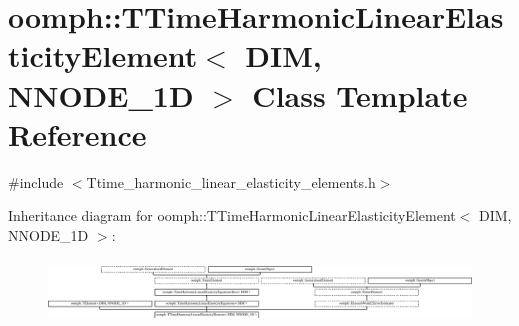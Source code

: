 \hypertarget{classoomph_1_1TTimeHarmonicLinearElasticityElement}{}\section{oomph\+:\+:T\+Time\+Harmonic\+Linear\+Elasticity\+Element$<$ D\+IM, N\+N\+O\+D\+E\+\_\+1D $>$ Class Template Reference}
\label{classoomph_1_1TTimeHarmonicLinearElasticityElement}


{\ttfamily \#include $<$Ttime\+\_\+harmonic\+\_\+linear\+\_\+elasticity\+\_\+elements.\+h$>$}

Inheritance diagram for oomph\+:\+:T\+Time\+Harmonic\+Linear\+Elasticity\+Element$<$ D\+IM, N\+N\+O\+D\+E\+\_\+1D $>$\+:\begin{figure}[H]
\begin{center}
\leavevmode
\includegraphics[height=1.732673cm]{classoomph_1_1TTimeHarmonicLinearElasticityElement}
\end{center}
\end{figure}
